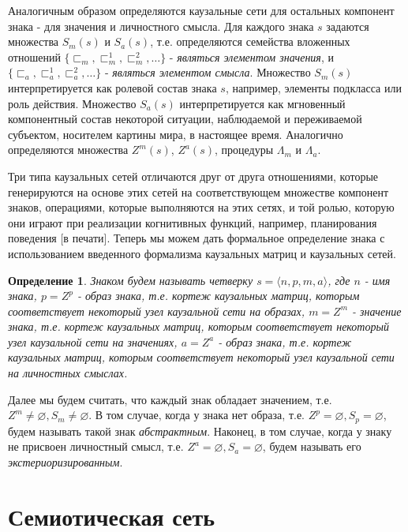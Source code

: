 \documentclass[12pt]{scrartcl}
\newtheorem{definition}{Определение}
\begin{document}
	Аналогичным образом определяются каузальные сети для остальных компонент знака - для значения и личностного смысла. Для каждого знака $s$ задаются множества $S_m(s)$ и $S_a(s)$, т.е. определяются семейства вложенных отношений $\{\sqsubset_m,\sqsubset_m^1,\sqsubset_m^2,\dots\}$ - \textit{являться элементом значения}, и $\{\sqsubset_a,\sqsubset_a^1,\sqsubset_a^2,\dots\}$ - \textit{являться элементом смысла}. Множество $S_m(s)$ интерпретируется как ролевой состав знака $s$, например, элементы подкласса или роль действия. Множество $S_a(s)$ интерпретируется как мгновенный компонентный состав некоторой ситуации, наблюдаемой и переживаемой субъектом, носителем картины мира, в настоящее время. Аналогично определяются множества $Z^m(s)$, $Z^a(s)$, процедуры $\Lambda_m$ и $\Lambda_a$.
	
	Три типа каузальных сетей отличаются друг от друга отношениями, которые генерируются на основе этих сетей на соответствующем множестве компонент знаков, операциями, которые выполняются на этих сетях, и той ролью, которую они играют при реализации когнитивных функций, например, планирования поведения [в печати]. Теперь мы можем дать формальное определение знака с использованием введенного формализма каузальных матриц и каузальных сетей.
	
	\begin{definition}
		Знаком будем называть четверку $s=\langle n, p, m, a \rangle$, где $n$ - имя знака, $p=Z^p$ - образ знака, т.е. кортеж каузальных матриц, которым соответствует некоторый узел каузальной сети на образах, $m=Z^m$ - значение знака, т.е. кортеж каузальных матриц, которым соответствует некоторый узел каузальной сети на значениях, $a=Z^a$ - образ знака, т.е. кортеж каузальных матриц, которым соответствует некоторый узел каузальной сети на личностных смыслах.
	\end{definition}
	
	Далее мы будем считать, что каждый знак обладает значением, т.е. $Z^m\not = \varnothing, S_m\not=\varnothing$. В том случае, когда у знака нет образа, т.е. $Z^p=\varnothing,S_p=\varnothing$, будем называть такой знак \textit{абстрактным}. Наконец, в том случае, когда у знаку не присвоен личностный смысл, т.е. $Z^a=\varnothing, S_a=\varnothing$, будем называть его \textit{экстериоризированным}.
	
	\section{Семиотическая сеть}
	
\end{document}
